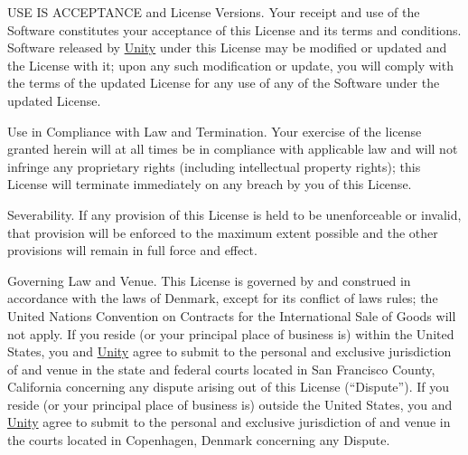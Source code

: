 \begin{DoxyEnumerate}
\item U\+SE IS A\+C\+C\+E\+P\+T\+A\+N\+CE and License Versions. Your receipt and use of the Software constitutes your acceptance of this License and its terms and conditions. Software released by \mbox{\hyperlink{namespace_unity}{Unity}} under this License may be modified or updated and the License with it; upon any such modification or update, you will comply with the terms of the updated License for any use of any of the Software under the updated License.
\item Use in Compliance with Law and Termination. Your exercise of the license granted herein will at all times be in compliance with applicable law and will not infringe any proprietary rights (including intellectual property rights); this License will terminate immediately on any breach by you of this License.
\item Severability. If any provision of this License is held to be unenforceable or invalid, that provision will be enforced to the maximum extent possible and the other provisions will remain in full force and effect.
\item Governing Law and Venue. This License is governed by and construed in accordance with the laws of Denmark, except for its conflict of laws rules; the United Nations Convention on Contracts for the International Sale of Goods will not apply. If you reside (or your principal place of business is) within the United States, you and \mbox{\hyperlink{namespace_unity}{Unity}} agree to submit to the personal and exclusive jurisdiction of and venue in the state and federal courts located in San Francisco County, California concerning any dispute arising out of this License (“\+Dispute”). If you reside (or your principal place of business is) outside the United States, you and \mbox{\hyperlink{namespace_unity}{Unity}} agree to submit to the personal and exclusive jurisdiction of and venue in the courts located in Copenhagen, Denmark concerning any Dispute. 
\end{DoxyEnumerate}